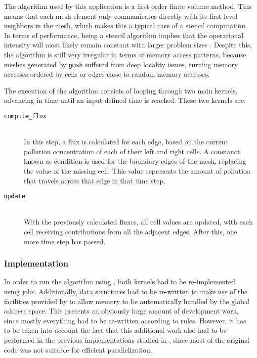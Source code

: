 \documentclass[main.tex]{subfiles}
\begin{document}
The algorithm used by this application is a first order finite volume method. This means that each mesh element only communicates directly with its first level neighbors in the mesh, which makes this a typical case of a stencil computation. In terms of performance, being a stencil algorithm implies that the operational intensity will most likely remain constant with larger problem sizes \cite{williams2009roofline,williams2010roofline}. Despite this, the algorithm is still very irregular in terms of memory access patterns, because meshes generated by \texttt{gmsh} suffered from deep locality issues, turning memory accesses ordered by cells or edges close to random memory accesses.

The execution of the algorithm consists of looping through two main kernels, advancing in time until an input-defined time is reached. These two kernels are:
\begin{description}
\item[\texttt{compute\_flux}] \hfill \\
  In this step, a flux is calculated for each edge, based on the current pollution concentration of each of their left and right cells. A constanct known as  condition is used for the boundary edges of the mesh, replacing the value of the missing cell. This value represents the amount of pollution that travels across that edge in that time step.

\item[\texttt{update}] \hfill \\
  With the previously calculated fluxes, all cell values are updated, with each cell receiving contributions from all the adjacent edges. After this, one more time step has passed.
\end{description}

\subsubsection{Implementation}

In order to run the algorithm using \gama, both kernels had to be re-implemented using \gama jobs. Additionally, data structures had to be re-written to make use of the facilities provided by \gama to allow memory to be automatically handled by the global address space.
This presents an obviously large amount of development work, since mostly everything had to be re-written according to \gama rules. However, it has to be taken into account the fact that this additional work also had to be performed in the previous implementations studied in \cite{naps2012}, since most of the original code was not suitable for efficient parallelization.
\end{document}
